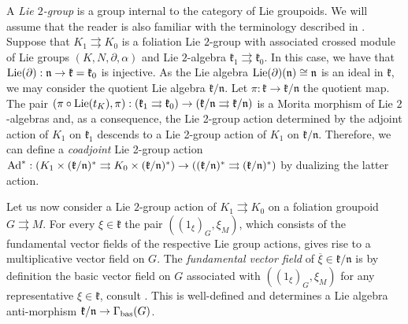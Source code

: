 \documentclass[
  a4paper, 
  reqno, 
  oneside, 
  12pt
]{amsart}
\theoremstyle{definition}
\theoremstyle{remark}
\newcommand{\rr}{\rightrightarrows}
\begin{document}
A \emph{Lie $2$-group} is a group internal to the category of Lie groupoids. We will assume that the reader is also familiar with the terminology described in \cite[s. 6]{HoffmanSjamaar}. Suppose that $K_1 \rightrightarrows K_0$ is a foliation Lie $2$-group with associated crossed module of Lie groups $(K,N,\partial,\alpha)$ and Lie $2$-algebra $\mathfrak{k}_1 \rightrightarrows \mathfrak{k}_0$. In this case, we have that $\textnormal{Lie}(\partial):\mathfrak{n}\to \mathfrak{k}=\mathfrak{k}_0$ is injective. As the Lie algebra $\textnormal{Lie}(\partial)(\mathfrak{n})\cong \mathfrak{n}$ is an ideal in $\mathfrak{k}$, we may consider the quotient Lie algebra $\mathfrak{k}/\mathfrak{n}$. Let $\pi:\mathfrak{k}\to \mathfrak{k}/\mathfrak{n}$ the quotient map. The pair $(\pi\circ \textnormal{Lie}(t_K),\pi):(\mathfrak{k}_1 \rightrightarrows \mathfrak{k}_0)\to (\mathfrak{k}/\mathfrak{n}\rightrightarrows \mathfrak{k}/\mathfrak{n})$ is a Morita morphism of Lie $2$-algebras and, as a consequence, the Lie 2-group action determined by the adjoint action of $K_1$ on $\mathfrak{k}_1$ descends to a Lie 2-group action of $K_1$ on $\mathfrak{k}/\mathfrak{n}$. Therefore, we can define a \emph{coadjoint} Lie 2-group action $\textnormal{Ad}^\ast:(K_1\times (\mathfrak{k}/\mathfrak{n})^\ast\rightrightarrows K_0\times (\mathfrak{k}/\mathfrak{n})^\ast)\to ((\mathfrak{k}/\mathfrak{n})^\ast \rightrightarrows (\mathfrak{k}/\mathfrak{n})^\ast)$ by dualizing the latter action. 

Let us now consider a Lie $2$-group action of $K_1\rr K_0$ on a foliation groupoid $G\rr M$. For every $\xi\in \mathfrak{k}$ the pair $((1_\xi)_{G},\xi_{M})$, which consists of the fundamental vector fields of the respective Lie group actions, gives rise to a multiplicative vector field on $G$. The \emph{fundamental vector field} of $\overline{\xi}\in \mathfrak{k}/\mathfrak{n}$ is by definition the basic vector field on $G$ associated with $((1_\xi)_{G},\xi_{M})$ for any representative $\xi\in \mathfrak{k}$, consult \cite[s. 5.4]{HoffmanSjamaar}. This is well-defined and determines a Lie algebra anti-morphism $\mathfrak{k}/\mathfrak{n}\to \Gamma_{\textnormal{bas}}(G)$.
\end{document}
